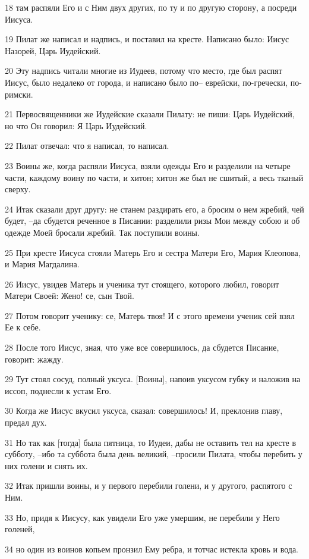\par 18 там распяли Его и с Ним двух других, по ту и по другую сторону, а посреди Иисуса.
\par 19 Пилат же написал и надпись, и поставил на кресте. Написано было: Иисус Назорей, Царь Иудейский.
\par 20 Эту надпись читали многие из Иудеев, потому что место, где был распят Иисус, было недалеко от города, и написано было по-- еврейски, по-гречески, по-римски.
\par 21 Первосвященники же Иудейские сказали Пилату: не пиши: Царь Иудейский, но что Он говорил: Я Царь Иудейский.
\par 22 Пилат отвечал: что я написал, то написал.
\par 23 Воины же, когда распяли Иисуса, взяли одежды Его и разделили на четыре части, каждому воину по части, и хитон; хитон же был не сшитый, а весь тканый сверху.
\par 24 Итак сказали друг другу: не станем раздирать его, а бросим о нем жребий, чей будет, --да сбудется реченное в Писании: разделили ризы Мои между собою и об одежде Моей бросали жребий. Так поступили воины.
\par 25 При кресте Иисуса стояли Матерь Его и сестра Матери Его, Мария Клеопова, и Мария Магдалина.
\par 26 Иисус, увидев Матерь и ученика тут стоящего, которого любил, говорит Матери Своей: Жено! се, сын Твой.
\par 27 Потом говорит ученику: се, Матерь твоя! И с этого времени ученик сей взял Ее к себе.
\par 28 После того Иисус, зная, что уже все совершилось, да сбудется Писание, говорит: жажду.
\par 29 Тут стоял сосуд, полный уксуса. [Воины], напоив уксусом губку и наложив на иссоп, поднесли к устам Его.
\par 30 Когда же Иисус вкусил уксуса, сказал: совершилось! И, преклонив главу, предал дух.
\par 31 Но так как [тогда] была пятница, то Иудеи, дабы не оставить тел на кресте в субботу, --ибо та суббота была день великий, --просили Пилата, чтобы перебить у них голени и снять их.
\par 32 Итак пришли воины, и у первого перебили голени, и у другого, распятого с Ним.
\par 33 Но, придя к Иисусу, как увидели Его уже умершим, не перебили у Него голеней,
\par 34 но один из воинов копьем пронзил Ему ребра, и тотчас истекла кровь и вода.
